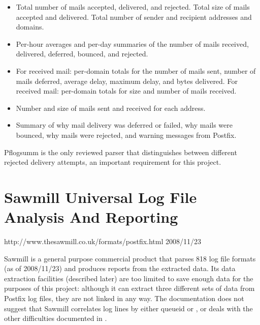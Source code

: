 \begin{itemize}

    \item Total number of mails accepted, delivered, and rejected.  Total
        size of mails accepted and delivered.  Total number of sender and
        recipient addresses and domains.

    \item Per-hour averages and per-day summaries of the number of mails
        received, delivered, deferred, bounced, and rejected.

    \item For received mail: per-domain totals for the number of mails
        sent, number of mails deferred, average delay, maximum delay, and
        bytes delivered.  For received mail: per-domain totals for size and
        number of mails received.

    \item Number and size of mails sent and received for each address.

    \item Summary of why mail delivery was deferred or failed, why mails
        were bounced, why mails were rejected, and warning messages from
        Postfix.

\end{itemize}

Pflogsumm is the only reviewed parser that distinguishes between different
rejected delivery attempts, an important requirement for this project.

\section{Sawmill Universal Log File Analysis And Reporting}

{http://www.thesawmill.co.uk/formats/postfix.html}
{2008/11/23}

Sawmill is a general purpose commercial product that parses 818 log file
formats (as of 2008/11/23) and produces reports from the extracted data.
Its data extraction facilities (described later) are too limited to save
enough data for the purposes of this project: although it can extract three
different sets of data from Postfix log files, they are not linked in any
way.  The documentation does not suggest that Sawmill correlates log lines
by either queueid or , or deals with the other difficulties
documented in .

